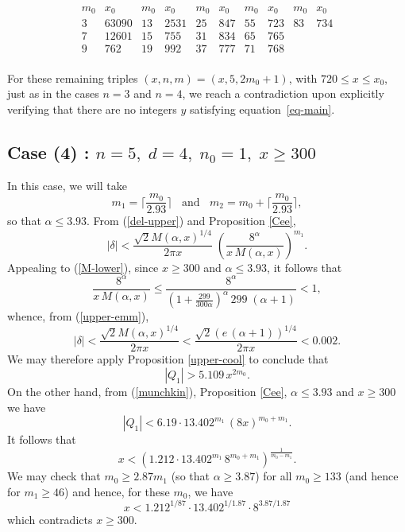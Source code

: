 $$
\begin{array}{cc|cc|cc|cc|cc} 
m_0 & x_0 & m_0 & x_0 & m_0 & x_0 & m_0 & x_0 & m_0 & x_0\\ \hline
3 & 63090 & 13 & 2531 & 25 & 847 & 55 & 723 & 83 & 734\\
7 & 12601 & 15 & 755 & 31 & 834 & 65 & 765\\
9 & 762 & 19 & 992 & 37 & 777 & 71 & 768\\

\end{array}
$$

 
For these remaining triples $(x,n,m)=(x,5,2m_0+1)$, with $720 \leq x \leq x_0$, just as in the cases $n=3$ and $n=4$, we reach a contradiction  upon explicitly verifying that there are no integers $y$ satisfying equation~\eqref{eq-main}. 

\subsection{Case (4) : $n=5, \; d=4, \;  n_0=1, \; x \geq 300$}

In this case, we will take
$$
m_1 = \Big\lceil \frac{m_0}{2.93} \Big\rceil \; \; \mbox{ and } \; \; m_2 = m_0+  \Big\lceil \frac{m_0}{2.93} \Big\rceil,
$$
so that $\alpha \leq 3.93$. 
From (\ref{del-upper}) and   Proposition \ref{Cee}, 
$$
|\delta| < \frac{\sqrt{2}M(\alpha,x)^{1/4}}{2\pi x} \; \left( \frac{8^{\alpha} }{x \, M(\alpha,x)} \right)^{m_1}.
$$
Appealing to (\ref{M-lower}), since $x \geq 300$ and $\alpha \leq 3.93$, it follows that 
$$
\frac{8^{\alpha} }{x \, M(\alpha,x)} \leq \frac{8^{\alpha} }{\left( 1 + \frac{299}{300 \alpha} \right)^\alpha \, 299 \; (\alpha+1)} < 1,
$$
whence, from (\ref{upper-emm}), 
$$
|\delta| < \frac{\sqrt{2}M(\alpha,x)^{1/4}}{2\pi x} < \frac{\sqrt{2}(e \, (\alpha+1))^{1/4}}{2\pi x}  < 0.002.
$$
We may therefore apply Proposition \ref{upper-cool} to conclude that
\begin{equation} \label{cliff2}
 |Q_1| > 5.109 \, x^{2m_0}.
\end{equation}
On the other hand, from (\ref{munchkin}), Proposition \ref{Cee}, $\alpha \leq 3.93$ and $x \geq 300$ we have
$$
|Q_1| < 6.19 \cdot 13.402^{m_1}  \, (8x)^{m_0+m_1}.
$$
 It follows that
\[
x < \left(1.212 \cdot 13.402^{m_1}  \, 8^{m_0+m_1} \right)^{\frac{1}{m_0-m_1}}.
\]
 We may check that $m_0 \geq 2.87 m_1$ (so that $\alpha\geq 3.87$) for all $m_0 \geq 133$ (and hence for $m_1\geq 46$) and hence, for these $m_0$, we have 
 $$
 x < 1.212^{1/87} \cdot 13.402^{1/1.87} \cdot 8^{3.87/1.87}
 $$
 which contradicts  $x\geq 300$. 
 

